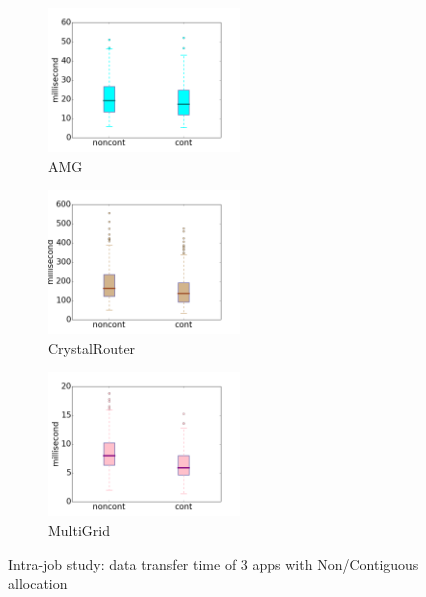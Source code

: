 \documentclass[conference]{IEEEtran}
\begin{document}
\begin{figure}[t!]
    \centering
    \begin{subfigure}[t]{0.32\textwidth}
        \centering
        \includegraphics[height=1.5in]{figs/intra-job/cont/amg_box}
        \caption{AMG}
        \label{fig:cont-amg}
    \end{subfigure}%
    \hspace{1em}%
    \begin{subfigure}[t]{0.32\textwidth}
        \centering
        \includegraphics[height=1.5in]{figs/intra-job/cont/cr_box}
        \caption{CrystalRouter}
        \label{fig:cont-cr}
    \end{subfigure}%
    \begin{subfigure}[t]{0.32\textwidth}
        \centering
        \includegraphics[height=1.5in]{figs/intra-job/cont/mg_box}
        \caption{MultiGrid}
        \label{fig:cont-mg}
    \end{subfigure}%
   \caption{Intra-job study: data transfer time of 3 apps with Non/Contiguous allocation}
   \label{fig: cont-time-box}
\end{figure}
\end{document}
